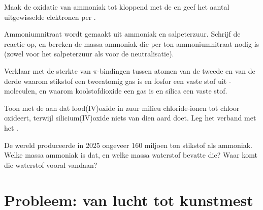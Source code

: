\begin{exercise}[$\star\star$]\label{exo:b1:p-block-13-15:8}
Maak de oxidatie van ammoniak tot  kloppend met de
 en geef het aantal uitgewisselde elektronen per
.
\end{exercise}

\begin{exercise}[$\star\star$]\label{exo:b1:p-block-13-15:9}
Ammoniumnitraat wordt gemaakt uit ammoniak en salpeterzuur. Schrijf de
reactie op, en bereken de massa ammoniak die per ton ammoniumnitraat
nodig is (zowel voor het salpeterzuur als voor de neutralisatie).
\end{exercise}

\begin{exercise}[$\star\star\star$]\label{exo:b1:p-block-13-15:10}
Verklaar met de sterkte van $\pi$-bindingen tussen atomen van de tweede
en van de derde  waarom stikstof een tweeatomig gas is en fosfor
een vaste stof uit -moleculen, en waarom koolstofdioxide een gas
is en silica een vaste stof.
\end{exercise}

\begin{exercise}[$\star\star\star$]\label{exo:b1:p-block-13-15:11}
Toon met de  aan dat lood(IV)oxide in zuur milieu
chloride-ionen tot chloor oxideert, terwijl silicium(IV)oxide niets van
dien aard doet. Leg het verband met het .
\end{exercise}

\begin{exercise}[$\star\star\star$]\label{exo:b1:p-block-13-15:12}
De wereld produceerde in 2025 ongeveer 160 miljoen ton stikstof als
ammoniak. Welke massa ammoniak is dat, en welke massa waterstof bevatte
die? Waar komt die waterstof vooral vandaan?
\end{exercise}

\section{Probleem: van lucht tot kunstmest}

